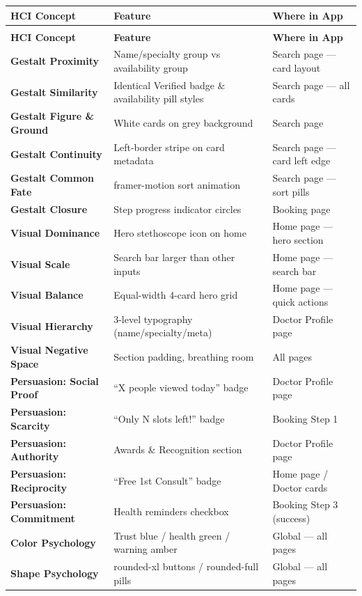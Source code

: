 \documentclass[12pt, a4paper]{article}
\begin{document}
\begin{center}
\begin{longtable}{>{\bfseries}p{3.5cm} p{4cm} p{5cm}}
\toprule
\textbf{HCI Concept} & \textbf{Feature} & \textbf{Where in App} \\
\midrule
\endfirsthead
\multicolumn{3}{c}{\textit{(continued)}} \\
\toprule
\textbf{HCI Concept} & \textbf{Feature} & \textbf{Where in App} \\
\midrule
\endhead
Gestalt Proximity & Name/specialty group vs availability group & Search page --- card layout \\
Gestalt Similarity & Identical Verified badge \& availability pill styles & Search page --- all cards \\
Gestalt Figure \& Ground & White cards on grey background & Search page \\
Gestalt Continuity & Left-border stripe on card metadata & Search page --- card left edge \\
Gestalt Common Fate & framer-motion sort animation & Search page --- sort pills \\
Gestalt Closure & Step progress indicator circles & Booking page \\
Visual Dominance & Hero stethoscope icon on home & Home page --- hero section \\
Visual Scale & Search bar larger than other inputs & Home page --- search bar \\
Visual Balance & Equal-width 4-card hero grid & Home page --- quick actions \\
Visual Hierarchy & 3-level typography (name/specialty/meta) & Doctor Profile page \\
Visual Negative Space & Section padding, breathing room & All pages \\
Persuasion: Social Proof & ``X people viewed today'' badge & Doctor Profile page \\
Persuasion: Scarcity & ``Only N slots left!'' badge & Booking Step 1 \\
Persuasion: Authority & Awards \& Recognition section & Doctor Profile page \\
Persuasion: Reciprocity & ``Free 1st Consult'' badge & Home page / Doctor cards \\
Persuasion: Commitment & Health reminders checkbox & Booking Step 3 (success) \\
Color Psychology & Trust blue / health green / warning amber & Global --- all pages \\
Shape Psychology & rounded-xl buttons / rounded-full pills & Global --- all pages \\

\end{longtable}
\end{center}
\end{document}
